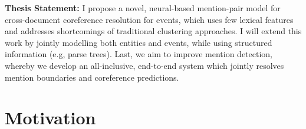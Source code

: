 \textbf{Thesis Statement:} I propose a novel, neural-based mention-pair model for cross-document coreference resolution for events, which uses few lexical features and addresses shortcomings of traditional clustering approaches.  I will extend this work by jointly modelling both entities and events, while using structured information (e.g, parse trees).  Last, we aim to improve mention detection, whereby we develop an all-inclusive, end-to-end system which jointly resolves mention boundaries and coreference predictions.

\vspace{10mm}

\section{Motivation}
%
%
%
